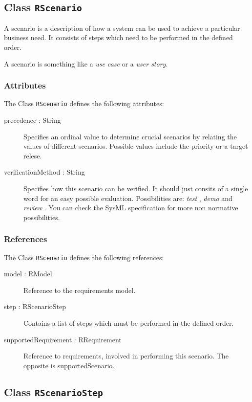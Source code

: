 \subsection{Class {\tt RScenario}}

A scenario is a description of how a system can be used to achieve a particular business need.
It consists of steps which need to be performed in the defined order.

A scenario is something like a \emph{use case} or a \emph{user story}.

\subsubsection{Attributes}

The Class \verb|RScenario| defines the following attributes:

\begin{description}
	\item[precedence : String] Specifies an ordinal value to determine crucial scenarios by relating the values of different scenarios.
Possible values include the priority or a target relese.
	\item[verificationMethod : String] Specifies how this scenario can be verified.
It should just consits of a single word for an easy possible evaluation.
Possibilities are: \emph{test} , \emph{demo}  and \emph{review} . You can check the SysML specification for more non normative possibilities.
\end{description}
\subsubsection{References}

The Class \verb|RScenario| defines the following references:

\begin{description}
	\item[model : RModel] Reference to the requirements model.
	\item[step : RScenarioStep] Contains a list of steps which must be performed in the defined order.
	\item[supportedRequirement : RRequirement] Reference to requirements, involved in performing this scenario. The opposite is supportedScenario.
\end{description}

\subsection{Class {\tt RScenarioStep}}

